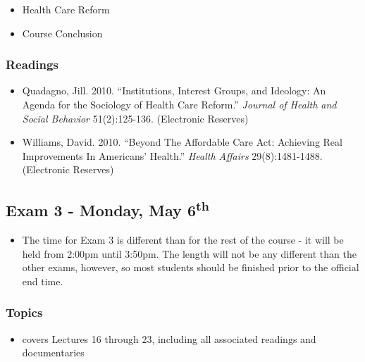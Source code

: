 \documentclass[]{book}
\providecommand{\tightlist}{%
  \setlength{\itemsep}{0pt}\setlength{\parskip}{0pt}}
\newenvironment{rmdblock}[1]
  {\begin{shaded*}
  \begin{itemize}
  \renewcommand{\labelitemi}{
    \raisebox{-.7\height}[0pt][0pt]{
      {\setkeys{Gin}{width=3em,keepaspectratio}\texttt{[image: images/\#1]}}
    }
  }
  \item
  }
  {
  \end{itemize}
  \end{shaded*}
  }
\newenvironment{rmdwarning}
  {\begin{rmdblock}{warning}}
  {\end{rmdblock}}
\begin{document}
\begin{itemize}
\tightlist
\item
  Health Care Reform
\item
  Course Conclusion
\end{itemize}

\hypertarget{readings-28}{%
\subsubsection*{Readings}\label{readings-28}}

\begin{itemize}
\tightlist
\item
  Quadagno, Jill. 2010. ``Institutions, Interest Groups, and Ideology: An Agenda for the Sociology of Health Care Reform.'' \emph{Journal of Health and Social Behavior} 51(2):125-136. (Electronic Reserves)
\item
  Williams, David. 2010. ``Beyond The Affordable Care Act: Achieving Real Improvements In Americans' Health.'' \emph{Health Affairs} 29(8):1481-1488. (Electronic Reserves)
\end{itemize}

\hypertarget{exam-3---monday-may-6th}{%
\subsection*{\texorpdfstring{Exam 3 - Monday, May 6\textsuperscript{th}}{Exam 3 - Monday, May 6th}}\label{exam-3---monday-may-6th}}

\begin{rmdwarning}
The time for Exam 3 is different than for the rest of the course - it
will be held from 2:00pm until 3:50pm. The length will not be any
different than the other exams, however, so most students should be
finished prior to the official end time.
\end{rmdwarning}

\hypertarget{topics-31}{%
\subsubsection*{Topics}\label{topics-31}}

\begin{itemize}
\tightlist
\item
  covers Lectures 16 through 23, including all associated readings and documentaries
\end{itemize}
\end{document}
